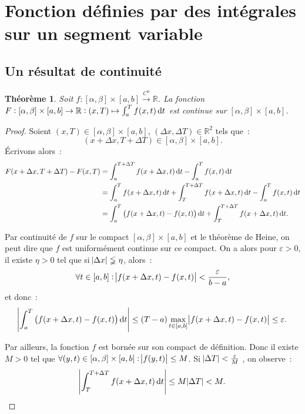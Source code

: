 \documentclass{report}
\newtheorem{thm}{Théorème}[chapter]
\theoremstyle{definition}
\theoremstyle{remark}
\numberwithin{equation}{section}
\newcommand{\R}{\mathbb R}
\newcommand{\toC}[1]{\xrightarrow{C^{#1}}}
\newcommand{\tocont}{\toC 0}
\begin{document}
	\section{Fonction définies par des intégrales sur un segment variable}
		\subsection{Un résultat de continuité}
			\begin{thm}\label{thm:continuitésegmentvariable} Soit $f : [\alpha, \beta] \times [a, b] \tocont \R$. La fonction
			$F : [\alpha, \beta] \times [a, b] \to \R : (x, T) \mapsto \int_a^Tf(x, t)\dif t$ est continue sur $[\alpha, \beta] \times [a, b]$.
			\end{thm}

			\begin{proof} Soient $(x, T) \in [\alpha, \beta] \times [a, b]$, $(\Delta x, \Delta T) \in \R^2$ tels que~:
			\begin{equation}
				(x + \Delta x, T + \Delta T) \in [\alpha, \beta] \times [a, b].
			\end{equation}
			Écrivons alors~:
			\begin{align}
				F(x + \Delta x, T + \Delta T) - F(x, T) &= \int_a^{T+\Delta T}f(x+\Delta x, t)\dif t - \int_a^Tf(x, t)\dif t \\
				&= \int_a^Tf(x+\Delta x, t)\dif t + \int_T^{T+\Delta T}f(x +\Delta x, t)\dif t - \int_a^Tf(x, t)\dif t \\
				&= \int_a^T\left(f(x+\Delta x, t) - f(x, t)\right)\dif t + \int_T^{T + \Delta T}f(x+\Delta x, t)\dif t.
			\end{align}

			Par continuité de $f$ sur le compact $[\alpha, \beta] \times [a, b]$ et le théorème de Heine, on peut dire que $f$ est uniformément continue sur
			ce compact. On a alors pour $\varepsilon > 0$, il existe $\eta > 0$ tel que si $\abs {\Delta x} \lneqq \eta$, alors~:
			\begin{equation}
				\forall t \in [a, b] : \abs {f(x+\Delta x, t) - f(x, t)} < \frac \varepsilon{b-a},
			\end{equation}
			et donc~:
			\begin{equation}
				\abs {\int_a^T\left(f(x+\Delta x, t) - f(x, t)\right)\dif t} \leq (T-a)\max_{t \in [a, b]}\abs {f(x+\Delta x, t) - f(x, t)} \leq \varepsilon.
			\end{equation}

			Par ailleurs, la fonction $f$ est bornée sur son compact de définition. Donc il existe $M > 0$ tel que
			$\forall (y, t) \in [\alpha, \beta] \times [a, b] : \abs {f(y, t)} \leq M$. Si $\abs {\Delta T} < \frac \varepsilon M$ , on observe~:
			\begin{equation}
				\abs {\int_T^{T + \Delta T}f(x + \Delta x, t)\dif t} \leq M\abs {\Delta T} < M.
			\end{equation}


\end{proof}
\end{document}

